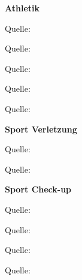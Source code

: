 \textbf{Athletik}

Quelle: ~\textcite{marquardt:2018:koordinationstrainingeinsteiger}

Quelle: ~\textcite{marquardt:2018:koordinationstraininglaufen}

Quelle: ~\textcite{marquardt:2018:rueckenuebung}

Quelle: ~\textcite{marquardt:2018:knieuebung}

Quelle: ~\textcite{marquardt:2018:fussuebung}

\textbf{Sport Verletzung}

Quelle: ~\textcite{marquardt:2018:schmerzendesknie}

Quelle: ~\textcite{marquardt:2018:verletzteachilles}

\textbf{Sport Check-up}

Quelle: ~\textcite{marquardt:2018:sportmedizinischertest}

Quelle: ~\textcite{marquardt:2018:bewegungsanalyse}

Quelle: ~\textcite{marquardt:2018:leistungsdiagnostik}

Quelle: ~\textcite{marquardt:2018:laufschuhberatungssysteme}

